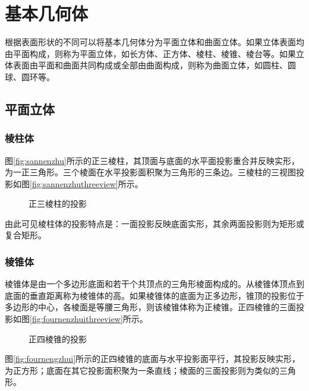 \section{基本几何体}

根据表面形状的不同可以将基本几何体分为平面立体和曲面立体。如果立体表面均由平面构成，则称为平面立体，如长方体、正方体、棱柱、棱锥、棱台等。如果立体表面由平面和曲面共同构成或全部由曲面构成，则称为曲面立体，如圆柱、圆球、圆环等。
\subsection{平面立体}

\subsubsection{棱柱体}



图\ref{fig:sannenzhu}所示的正三棱柱，其顶面与底面的水平面投影重合并反映实形，为一正三角形。三个棱面在水平投影面积聚为三角形的三条边。三棱柱的三视图投影如图\ref{fig:sannenzhuthreeview}所示。
\begin{figure}[htbp]
\centering
{}\hspace{30pt}
\caption{正三棱柱的投影}
\end{figure}



由此可见棱柱体的投影特点是：一面投影反映底面实形，其余两面投影则为矩形或复合矩形。
\subsubsection{棱锥体}
棱锥体是由一个多边形底面和若干个共顶点的三角形棱面构成的。从棱锥体顶点到底面的垂直距离称为棱锥体的高。如果棱锥体的底面为正多边形，锥顶的投影位于多边形的中心，各棱面是等腰三角形，则该棱锥体称为正棱锥。正四棱锥的三面投影如图\ref{fig:fournenzhuithreeview}所示。

\begin{figure}[htbp]
\centering
{}\hspace{30pt}
\caption{正四棱锥的投影}
\end{figure}

图\ref{fig:fournengzhui}所示的正四棱锥的底面与水平投影面平行，其投影反映实形，为正方形；底面在其它投影面积聚为一条直线；棱面的三面投影则为类似的三角形。

